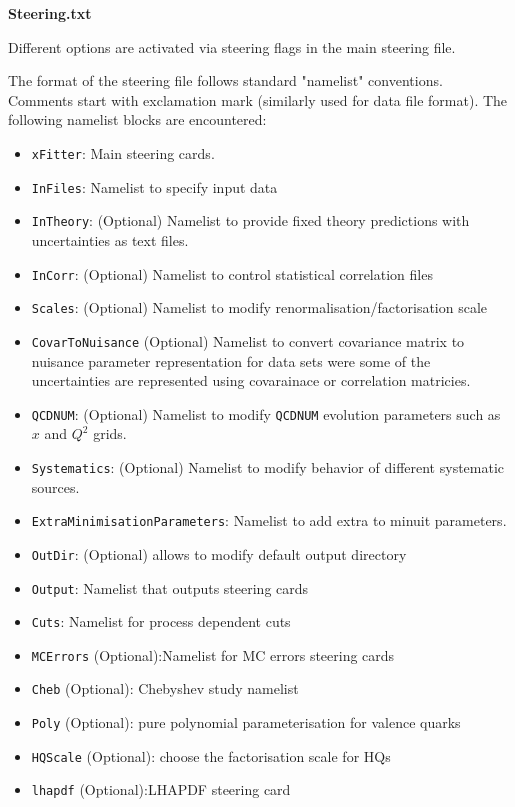 \begin{description}
\item \bf{Steering.txt}\rm 

Different options are activated via steering flags in the main steering file.
 
The format of the steering file follows standard "namelist" conventions.
Comments start with exclamation mark (similarly used for data file format).
The following namelist blocks are encountered:
\begin{itemize}
\item  {\tt xFitter}: Main steering cards. 
\item  {\tt InFiles}: Namelist to specify input data
\item  {\tt InTheory}: (Optional) Namelist to provide fixed theory predictions with uncertainties as text files.
\item  {\tt InCorr}: (Optional) Namelist to control statistical correlation files
\item  {\tt Scales}: (Optional) Namelist to modify renormalisation/factorisation scale
\item  {\tt CovarToNuisance} (Optional) Namelist to convert covariance matrix to nuisance parameter representation
for data sets were some of the uncertainties are represented using covarainace or correlation matricies.
\item  {\tt QCDNUM}: (Optional) Namelist to modify {\tt QCDNUM} evolution parameters such as $x$ and $Q^2$ grids.
\item  {\tt Systematics}: (Optional) Namelist to modify behavior of different systematic sources.
\item  {\tt ExtraMinimisationParameters}:  Namelist to add extra to minuit parameters.
\item  {\tt OutDir}: (Optional) allows to modify default output directory 
\item  {\tt Output}: Namelist that outputs steering cards 
\item  {\tt Cuts}: Namelist for process dependent cuts
\item  {\tt MCErrors} (Optional):Namelist for MC errors steering cards
\item  {\tt Cheb} (Optional): Chebyshev study namelist
\item  {\tt Poly} (Optional): pure polynomial parameterisation for valence quarks
\item  {\tt HQScale} (Optional): choose the factorisation scale for HQs
\item  {\tt lhapdf} (Optional):LHAPDF steering card
\end{itemize}


\end{description}
